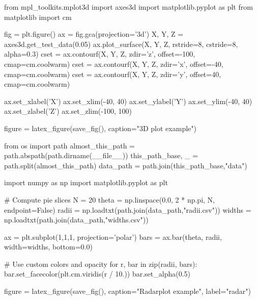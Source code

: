\begin{pycode}[3dplot]
from mpl_toolkits.mplot3d import axes3d
import matplotlib.pyplot as plt
from matplotlib import cm

fig = plt.figure()
ax = fig.gca(projection='3d')
X, Y, Z = axes3d.get_test_data(0.05)
ax.plot_surface(X, Y, Z, rstride=8, cstride=8, alpha=0.3)
cset = ax.contourf(X, Y, Z, zdir='z', offset=-100, cmap=cm.coolwarm)
cset = ax.contourf(X, Y, Z, zdir='x', offset=-40, cmap=cm.coolwarm)
cset = ax.contourf(X, Y, Z, zdir='y', offset=40, cmap=cm.coolwarm)

ax.set_xlabel('X')
ax.set_xlim(-40, 40)
ax.set_ylabel('Y')
ax.set_ylim(-40, 40)
ax.set_zlabel('Z')
ax.set_zlim(-100, 100)

figure = latex_figure(save_fig(), caption="3D plot example")
\end{pycode}
\begin{pycode}[radar]
from os import path
almost_this_path = path.abspath(path.dirname(__file__))
this_path_base, _ = path.split(almost_this_path)
data_path = path.join(this_path_base,"data")
    
import numpy as np
import matplotlib.pyplot as plt


# Compute pie slices
N = 20
theta = np.linspace(0.0, 2 * np.pi, N, endpoint=False)
radii = np.loadtxt(path.join(data_path,"radii.csv"))
widths = np.loadtxt(path.join(data_path,"widths.csv"))

ax = plt.subplot(1,1,1, projection='polar')
bars = ax.bar(theta, radii, width=widths, bottom=0.0)

# Use custom colors and opacity
for r, bar in zip(radii, bars):
    bar.set_facecolor(plt.cm.viridis(r / 10.))
    bar.set_alpha(0.5)

figure = latex_figure(save_fig(), caption="Radarplot example", label="radar")
\end{pycode}
